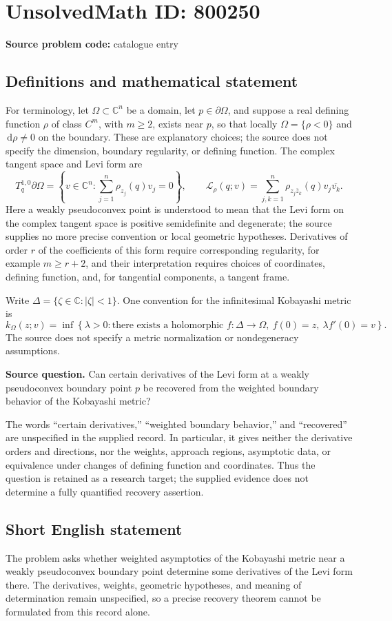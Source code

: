 \documentclass[11pt]{article}
\newcommand{\C}{\mathbb{C}}
\newcommand{\dd}{\,\mathrm{d}}
\begin{document}
\section*{UnsolvedMath ID: 800250}
\textbf{Source problem code:} catalogue entry
\subsection{Definitions and mathematical statement}
For terminology, let \(\Omega\subset\C^n\) be a domain, let \(p\in\partial\Omega\), and suppose a real defining function \(\rho\) of class \(C^m\), with \(m\geq2\), exists near \(p\), so that locally \(\Omega=\{\rho<0\}\) and \(\dd\rho\neq0\) on the boundary. These are explanatory choices; the source does not specify the dimension, boundary regularity, or defining function. The complex tangent space and Levi form are
\[
T_q^{1,0}\partial\Omega=\left\{v\in\C^n:\sum_{j=1}^n\rho_{z_j}(q)v_j=0\right\},\qquad
\mathcal L_\rho(q;v)=\sum_{j,k=1}^n\rho_{z_j\overline z_k}(q)v_j\overline{v_k}.
\]
Here a weakly pseudoconvex point is understood to mean that the Levi form on the complex tangent space is positive semidefinite and degenerate; the source supplies no more precise convention or local geometric hypotheses. Derivatives of order \(r\) of the coefficients of this form require corresponding regularity, for example \(m\geq r+2\), and their interpretation requires choices of coordinates, defining function, and, for tangential components, a tangent frame.

Write \(\Delta=\{\zeta\in\C:|\zeta|<1\}\). One convention for the infinitesimal Kobayashi metric is
\[
k_\Omega(z;v)=\inf\left\{\lambda>0:\text{there exists a holomorphic }f:\Delta\to\Omega,\ f(0)=z,\ \lambda f'(0)=v\right\}.
\]
The source does not specify a metric normalization or nondegeneracy assumptions.

\textbf{Source question.} Can certain derivatives of the Levi form at a weakly pseudoconvex boundary point \(p\) be recovered from the weighted boundary behavior of the Kobayashi metric?

The words ``certain derivatives,'' ``weighted boundary behavior,'' and ``recovered'' are unspecified in the supplied record. In particular, it gives neither the derivative orders and directions, nor the weights, approach regions, asymptotic data, or equivalence under changes of defining function and coordinates. Thus the question is retained as a research target; the supplied evidence does not determine a fully quantified recovery assertion.
\subsection{Short English statement}
The problem asks whether weighted asymptotics of the Kobayashi metric near a weakly pseudoconvex boundary point determine some derivatives of the Levi form there. The derivatives, weights, geometric hypotheses, and meaning of determination remain unspecified, so a precise recovery theorem cannot be formulated from this record alone.
\end{document}
